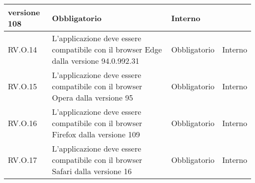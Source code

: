 \begin{longtable}{|C{2.7cm}|L{7.2cm}|C{2.7cm}|C{2cm}|}
        versione 108
         & Obbligatorio & Interno \\
        \hline
        RV.O.14 & L’applicazione deve essere compatibile con il browser Edge dalla versione 94.0.992.31 
         & Obbligatorio & Interno \\
        \hline
        RV.O.15 & L’applicazione deve essere compatibile con il browser Opera dalla
        versione 95
         & Obbligatorio & Interno \\
        \hline
        RV.O.16 &L’applicazione deve essere compatibile con il browser Firefox dalla
versione 109 
         & Obbligatorio & Interno \\
        \hline
        RV.O.17 & L’applicazione deve essere compatibile con il browser Safari dalla
versione 16
         & Obbligatorio & Interno \\
        \hline


        
        

\end{longtable}